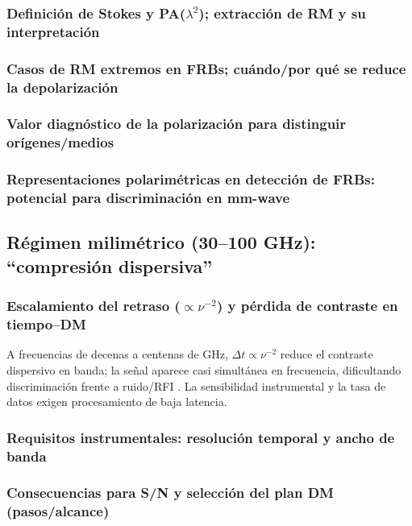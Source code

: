 \subsubsection{Definición de Stokes y PA($\lambda^2$); extracción de RM y su interpretación}

\subsubsection{Casos de RM extremos en FRBs; cuándo/por qué se reduce la depolarización}

\subsubsection{Valor diagnóstico de la polarización para distinguir orígenes/medios}

\subsubsection{Representaciones polarimétricas en detección de FRBs: potencial para discriminación en mm-wave}

\subsection{Régimen milimétrico (30--100 GHz): ``compresión dispersiva''}

\subsubsection{Escalamiento del retraso ($\propto\nu^{-2}$) y pérdida de contraste en tiempo--DM}

A frecuencias de decenas a centenas de GHz, $\Delta t\propto \nu^{-2}$ reduce el 
contraste dispersivo en banda; la señal aparece casi simultánea en frecuencia, 
dificultando discriminación frente a ruido/RFI \citep{LorimerKramer2004,CordesChatterjee2019}. 
La sensibilidad instrumental y la tasa de datos exigen procesamiento de baja latencia.

\subsubsection{Requisitos instrumentales: resolución temporal y ancho de banda}

\subsubsection{Consecuencias para S/N y selección del plan DM (pasos/alcance)}

